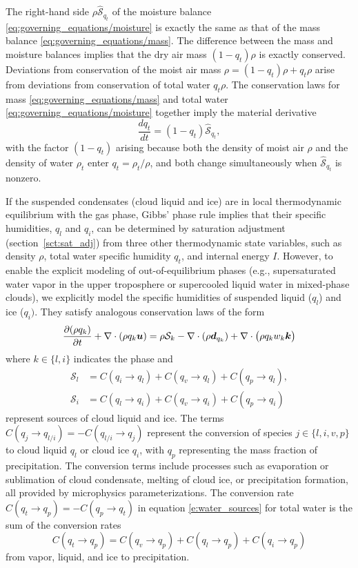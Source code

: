 \documentclass{report}
\begin{document}
The right-hand side $\rho \mathcal{\hat S}_{q_t}$ of the moisture balance \eqref{eq:governing_equations/moisture} is exactly the same as that of the mass balance \eqref{eq:governing_equations/mass}. The difference between the mass and moisture balances implies that the dry air mass $(1-q_t)\rho$ is exactly conserved. Deviations from conservation of the moist air mass $\rho = (1-q_t)\rho + q_t \rho$ arise from deviations from conservation of total water $q_t\rho$. The conservation laws for mass \eqref{eq:governing_equations/mass} and total water \eqref{eq:governing_equations/moisture} together imply the material derivative 
\[
\frac{dq_t}{dt} = (1-q_t) \mathcal{\hat S}_{q_t},
\]
with the factor $(1-q_t)$ arising because both the density of moist air $\rho$ and the density of water $\rho_t$ enter $q_t = \rho_t/\rho$, and both change simultaneously when $\mathcal{\hat S}_{q_t}$ is nonzero.

If the suspended condensates (cloud liquid and ice) are in local thermodynamic equilibrium with the gas phase, Gibbs' phase rule implies that their specific humidities, $q_l$ and $q_i$, can be determined by saturation adjustment (section~\ref{sct:sat_adj}) from three other thermodynamic state variables, such as density $\rho$, total water specific humidity $q_t$, and internal energy $I$. However, to enable the explicit modeling of out-of-equilibrium phases (e.g., supersaturated water vapor in the upper troposphere or supercooled liquid water in mixed-phase clouds), we explicitly model the specific humidities of suspended liquid ($q_l$) and ice ($q_i)$. They satisfy analogous conservation laws of the form
\begin{equation}
\frac{\partial (\rho q_k)}{\partial t} + \nabla \cdot (\rho q_k \boldsymbol{{u}}) = \rho \mathcal{S}_k  -\nabla \cdot (\rho \boldsymbol{{d}}_{q_k}) + \nabla \cdot \bigl(\rho q_k w_k \boldsymbol{{k}} \bigr)  
\label{eq:governing_equations/condensate}
\end{equation}
where $k \in \{l, i\}$ indicates the phase and 
\begin{align}
    \mathcal{S}_l & = C(q_i \rightarrow q_l) + C(q_v \rightarrow q_l) + C(q_p \rightarrow q_l), \\
    \mathcal{S}_i & = C(q_l \rightarrow q_i) + C(q_v \rightarrow q_i) + C(q_p \rightarrow q_i)
\end{align}
represent sources of cloud liquid and ice. The terms $C(q_j \rightarrow q_{l/i}) = - C(q_{l/i} \rightarrow q_j)$ represent the conversion of species $j \in \{l, i, v, p\}$ to cloud liquid $q_l$ or cloud ice $q_i$, with $q_p$ representing the mass fraction of precipitation. The conversion terms include processes such as evaporation or sublimation of cloud condensate, melting of cloud ice, or precipitation formation, all provided by microphysics parameterizations. The conversion rate $C(q_t \rightarrow q_p) = -C(q_p \rightarrow q_t)$ in equation \eqref{e:water_sources} for total water is the sum of the conversion rates
\begin{equation}
    C(q_t \rightarrow q_p) = C(q_v \rightarrow q_p) + C(q_l \rightarrow q_p) + C(q_i \rightarrow q_p)
\end{equation}
from vapor, liquid, and ice to precipitation. 
\end{document}
